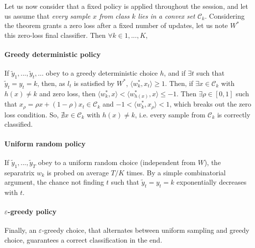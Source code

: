 \documentclass[preprint,12pt,authoryear]{elsarticle}
\begin{document}
Let us now consider  that a fixed policy is applied throughout the session, and let us assume that \emph{every sample $x$ from class $k$ lies in a convex set $\mathcal{C}_k$}. 
Considering the theorem grants a zero loss after a fixed number of updates, let us note  $W^*$ this zero-loss final classifier. Then $\forall k \in 1,...,K$, 




	\paragraph{Greedy deterministic policy} If $\tilde{y}_1, ...,\tilde{y}_t, ...$ obey to a greedy deterministic choice $h$, and if $\exists t$ such that $\tilde{y}_t = y_t = k$, then, as $l_t$ is satisfied by $W^*$, $\langle w_k^*, x_t\rangle \geq 1$.  Then, if $\exists x \in \mathcal{C}_k$ with $h(x) \neq k$ and zero loss, then $\langle w_k^*, x\rangle < \langle w_{h(x)}^*, x\rangle \leq -1$. Then $\exists \rho \in [0,1]$ such that $x_\rho = \rho x + (1-\rho) x_t \in \mathcal{C}_k$ and 
	$-1 < \langle w_k^*,x_\rho \rangle < 1 $, which breaks out the zero loss condition. So, $\nexists x \in \mathcal{C}_k$ with $h(x) \neq k$, i.e. every sample from $\mathcal{C}_k$ is correctly classified.
	\paragraph{Uniform random policy} If $\tilde{y}_1, ...,\tilde{y}_T$ obey to a uniform random choice (independent from $W$), the separatrix $w_k$ is probed on average $T/K$ times. By a simple combinatorial argument, the chance not finding $t$ such that $\tilde{y}_t = y_t = k$ exponentially decreases with $t$.
	\paragraph{$\varepsilon$-greedy policy} Finally, an $\varepsilon$-greedy choice, that alternates between uniform sampling and greedy choice, guarantees a correct classification in the end.  
\end{document}
